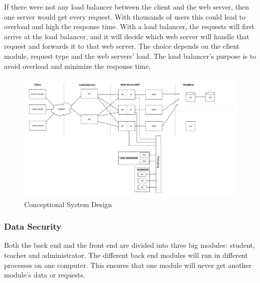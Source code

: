 If there were not any load balancer between the client and the web server, then one server would get every request. With thousands of users this could lead to overload and high the response time. With a load balancer, the requests will first arrive at the load balancer, and it will decide which web server will handle that request and forwards it to that web server. The choice depends on the client module, request type and the web servers' load. The load balancer's purpose is to avoid overload and minimize the response time.

 
 \begin{figure}[!htbp]
 	\includegraphics[width=0.95\textheight, angle=90]{figures/atfogo_rendszerterv_teljes.pdf}
 	\caption[Conceptional System Design]{Conceptional System Design}
 	\label{fig:conceptional-system-design}
 \end{figure}
 
 \subsubsection{Data Security}

 
 Both the back end and the front end are divided into three big modules: student, teacher and administrator. The different back end modules will run in different processes on one computer. This ensures that one module will never get another module's data or requests. 
 

